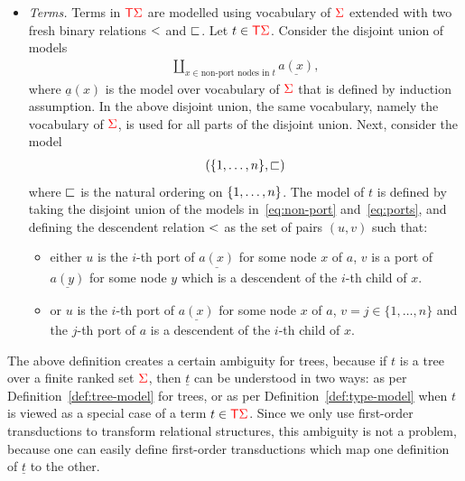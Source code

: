 \begin{definition}
\begin{itemize}
                
        \item \emph{Terms.}   Terms in ${\color{red}{\mathsf T}} {\color{red}{\Sigma}}$ are modelled using vocabulary of ${\color{red}{\Sigma}}$ extended with two fresh binary relations $<$ and $\sqsubset$. 
          Let $t \in {\color{red}{\mathsf T}} {\color{red}{\Sigma}}$. Consider the disjoint union of models
            \begin{align}\label{eq:non-port}
                 \coprod_{x \in \text{non-port nodes in $t$}} \underline{a(x)},
            \end{align}
         where  $\underline a(x)$ is the model over vocabulary of ${\color{red}{\Sigma}}$ that  is defined by induction assumption.   In the above  disjoint union, the same vocabulary, namely the vocabulary of ${\color{red}{\Sigma}}$,  is used  for all parts of the disjoint union. Next, consider  the model
            \begin{align}\label{eq:ports}
            (\{1,\ldots,n\}, \sqsubset)
            \end{align}
            where $\sqsubset$ is the natural ordering on $\{1,\ldots,n\}$. 
            The model of $t$ is defined by taking the disjoint union of the models in~\eqref{eq:non-port} and~\eqref{eq:ports}, and defining the descendent relation $<$ as the set of pairs $(u,v)$ such that:
            \begin{itemize}
            \item either $u$ is the $i$-th port of $\underline{a(x)}$ for some node $x$ of $a$, $v$ is a port of $\underline{a(y)}$ for some node $y$ which is a descendent of the $i$-th child of $x$.
            \item or $u$ is the $i$-th port of $\underline{a(x)}$ for some node $x$ of $a$, $v=j\in\{1,\dots,n\}$ and the $j$-th port of $a$ is a descendent of the $i$-th child of $x$.
            \end{itemize} 

    \end{itemize}
\end{definition}

The above  definition creates a certain ambiguity for trees, because if $t$ is a tree over a finite ranked set ${\color{red}{\Sigma}}$, then $\underline t$ can be understood in two ways: as per  Definition~\ref{def:tree-model} for trees, or as per Definition~\ref{def:type-model} when $t$ is viewed as a special case of a term $t \in {\color{red}{\mathsf T}} {\color{red}{\Sigma}}$. Since we only use first-order transductions to transform relational structures,  this ambiguity is not a problem, because one can easily define first-order transductions which map one definition of $\underline t$ to the other.


